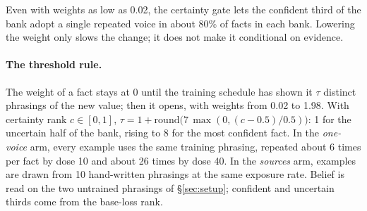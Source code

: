 \documentclass[11pt]{article}
\begin{document}
Even with weights as low as 0.02, the certainty gate lets the confident third of the bank adopt a single repeated voice in about 80\% of facts in each bank.
Lowering the weight only slows the change; it does not make it conditional on evidence.

\paragraph{The threshold rule.}
The weight of a fact stays at 0 until the training schedule has shown it $\tau$ distinct phrasings of the new value; then it opens, with weights from 0.02 to 1.98.
With certainty rank $c\in[0,1]$, $\tau = 1 + \mathrm{round}\big(7\,\max(0,(c-0.5)/0.5)\big)$: 1 for the uncertain half of the bank, rising to 8 for the most confident fact.
In the \emph{one-voice} arm, every example uses the same training phrasing, repeated about 6 times per fact by dose 10 and about 26 times by dose 40.
In the \emph{sources} arm, examples are drawn from 10 hand-written phrasings at the same exposure rate.
Belief is read on the two untrained phrasings of \S\ref{sec:setup}; confident and uncertain thirds come from the base-loss rank.
\end{document}

